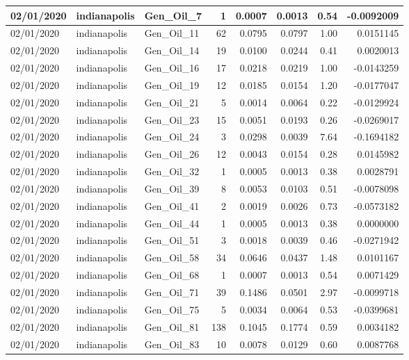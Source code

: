 \documentclass[
  letterpaper,
  DIV=11,
  numbers=noendperiod]{scrartcl}
\begin{document}
\begin{tabular}{l|l|l|r|r|r|r|r}
\hline
02/01/2020 & indianapolis & Gen\_Oil\_7 & 1 & 0.0007 & 0.0013 & 0.54 & -0.0092009\\
\hline
02/01/2020 & indianapolis & Gen\_Oil\_11 & 62 & 0.0795 & 0.0797 & 1.00 & 0.0151145\\
\hline
02/01/2020 & indianapolis & Gen\_Oil\_14 & 19 & 0.0100 & 0.0244 & 0.41 & 0.0020013\\
\hline
02/01/2020 & indianapolis & Gen\_Oil\_16 & 17 & 0.0218 & 0.0219 & 1.00 & -0.0143259\\
\hline
02/01/2020 & indianapolis & Gen\_Oil\_19 & 12 & 0.0185 & 0.0154 & 1.20 & -0.0177047\\
\hline
02/01/2020 & indianapolis & Gen\_Oil\_21 & 5 & 0.0014 & 0.0064 & 0.22 & -0.0129924\\
\hline
02/01/2020 & indianapolis & Gen\_Oil\_23 & 15 & 0.0051 & 0.0193 & 0.26 & -0.0269017\\
\hline
02/01/2020 & indianapolis & Gen\_Oil\_24 & 3 & 0.0298 & 0.0039 & 7.64 & -0.1694182\\
\hline
02/01/2020 & indianapolis & Gen\_Oil\_26 & 12 & 0.0043 & 0.0154 & 0.28 & 0.0145982\\
\hline
02/01/2020 & indianapolis & Gen\_Oil\_32 & 1 & 0.0005 & 0.0013 & 0.38 & 0.0028791\\
\hline
02/01/2020 & indianapolis & Gen\_Oil\_39 & 8 & 0.0053 & 0.0103 & 0.51 & -0.0078098\\
\hline
02/01/2020 & indianapolis & Gen\_Oil\_41 & 2 & 0.0019 & 0.0026 & 0.73 & -0.0573182\\
\hline
02/01/2020 & indianapolis & Gen\_Oil\_44 & 1 & 0.0005 & 0.0013 & 0.38 & 0.0000000\\
\hline
02/01/2020 & indianapolis & Gen\_Oil\_51 & 3 & 0.0018 & 0.0039 & 0.46 & -0.0271942\\
\hline
02/01/2020 & indianapolis & Gen\_Oil\_58 & 34 & 0.0646 & 0.0437 & 1.48 & 0.0101167\\
\hline
02/01/2020 & indianapolis & Gen\_Oil\_68 & 1 & 0.0007 & 0.0013 & 0.54 & 0.0071429\\
\hline
02/01/2020 & indianapolis & Gen\_Oil\_71 & 39 & 0.1486 & 0.0501 & 2.97 & -0.0099718\\
\hline
02/01/2020 & indianapolis & Gen\_Oil\_75 & 5 & 0.0034 & 0.0064 & 0.53 & -0.0399681\\
\hline
02/01/2020 & indianapolis & Gen\_Oil\_81 & 138 & 0.1045 & 0.1774 & 0.59 & 0.0034182\\
\hline
02/01/2020 & indianapolis & Gen\_Oil\_83 & 10 & 0.0078 & 0.0129 & 0.60 & 0.0087768\\

\end{tabular}
\end{document}
